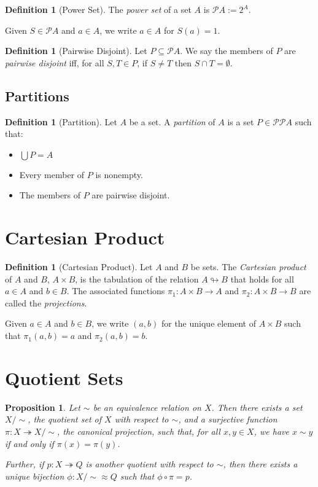 \documentclass{book}
\newtheorem{prop}[ax]{Proposition}
\theoremstyle{definition}
\newtheorem{df}[ax]{Definition}
\begin{document}
\begin{df}[Power Set]
The \emph{power set} of a set $A$ is $\mathcal{P} A := 2^A$.

Given $S \in \mathcal{P} A$ and $a \in A$, we write $a \in A$ for $S(a) = 1$.
\end{df}

\begin{df}[Pairwise Disjoint]
Let $P \subseteq \mathcal{P} A$. We say the members of $P$ are \emph{pairwise disjoint} iff, for all $S,T \in P$, if $S \neq T$ then $S \cap T = \emptyset$.
\end{df}

\subsection{Partitions}

\begin{df}[Partition]
Let $A$ be a set. A \emph{partition} of $A$ is a set $P \in \mathcal{P} \mathcal{P} A$ such that:
\begin{itemize}
\item $\bigcup P = A$
\item Every member of $P$ is nonempty.
\item The members of $P$ are pairwise disjoint.
\end{itemize}
\end{df}

\section{Cartesian Product}

\begin{df}[Cartesian Product]
Let $A$ and $B$ be sets. The \emph{Cartesian product} of $A$ and $B$, $A \times B$, is the tabulation of the relation $A \looparrowright B$ that holds for all $a \in A$ and $b \in B$. The associated functions $\pi_1 : A \times B \rightarrow A$ and $\pi_2 : A \times B \rightarrow B$ are called the \emph{projections}.

Given $a \in A$ and $b \in B$, we write $(a,b)$ for the unique element of $A \times B$ such that $\pi_1(a,b) = a$ and $\pi_2(a,b) = b$.
\end{df}

\section{Quotient Sets}

\begin{prop}
Let $\sim$ be an equivalence relation on $X$. Then there exists a set $X/\sim$, the \emph{quotient set} of $X$ with respect to $\sim$, and a surjective function $\pi : X \twoheadrightarrow X / \sim$, the \emph{canonical projection}, such that, for all $x,y \in X$, we have $x \sim y$ if and only if $\pi(x) = \pi(y)$.

Further, if $p : X \twoheadrightarrow Q$ is another quotient with respect to $\sim$, then there exists a unique bijection $\phi : X / \sim \approx Q$ such that $\phi \circ \pi = p$.
\end{prop}
\end{document}

